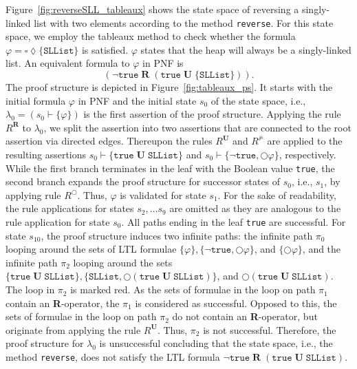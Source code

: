 \documentclass[a4paper, 12pt, twoside]{report}
\begin{document}
	Figure~\ref{fig:reverseSLL_tableaux} shows the state space of reversing a singly-linked list with two elements according to the method \texttt{reverse}. For this state space, we employ the tableaux method to check whether the formula $\varphi=\square \lozenge \{\texttt{SLList}\}$ is satisfied. $\varphi$ states that the heap will always be a singly-linked list. An equivalent formula to $\varphi$ in PNF is \[(\neg \texttt{true}\;\textbf{R}\;(\texttt{true}\;\textbf{U}\;\{\texttt{SLList}\})).\] The proof structure is depicted in Figure~\ref{fig:tableaux_ps}. It starts with the initial formula $\varphi$ in PNF and the initial state $s_0$ of the state space, i.e., $\lambda_0 = (s_0 \vdash \{\varphi\})$ is the first assertion of the proof structure. Applying the rule $R^{\textbf{R}}$ to $\lambda_0$, we split the assertion into two assertions that are connected to the root assertion via directed edges. Thereupon the rules $R^{\textbf{U}}$ and $R^{\nvDash}$ are applied to the resulting assertions $s_0 \vdash \{\texttt{true}\;\textbf{U}\;\texttt{SLList}\}$ and  $s_0 \vdash \{\neg\texttt{true}, \bigcirc\varphi\}$, respectively. While the first branch terminates in the leaf with the Boolean value \texttt{true}, the second branch expands the proof structure for successor states of $s_0$, i.e., $s_1$, by applying rule $R^{\bigcirc}$. Thus, $\varphi$ is validated for state $s_1$. For the sake of readability, the rule applications for states $s_2, \dots s_9$ are omitted as they are analogous to the rule application for state $s_0$. All paths ending in the leaf \texttt{true} are successful. For state $s_{10}$, the proof structure induces two infinite paths: the infinite path $\pi_0$ looping around the sets of LTL formulae $\{\varphi\}, \{\neg\texttt{true},\bigcirc\varphi\}$, and $\{\bigcirc\varphi\}$, and the infinite path $\pi_2$ looping around the sets $\{\texttt{true}\;\textbf{U}\;\texttt{SLList}\},\{\texttt{SLList}, \bigcirc(\texttt{true}\;\textbf{U}\;\texttt{SLList})\}$, and $\bigcirc(\texttt{true}\;\textbf{U}\;\texttt{SLList})$. The loop in $\pi_2$ is marked red. As the sets of formulae in the loop on path $\pi_1$ contain an \textbf{R}-operator, the $\pi_1$ is considered as successful. Opposed to this, the sets of formulae in the loop on path $\pi_2$ do not contain an \textbf{R}-operator, but originate from applying the rule $R^{\textbf{U}}$. Thus, $\pi_2$ is not successful. Therefore, the proof structure for $\lambda_0$ is unsuccessful concluding that the state space, i.e., the method \texttt{reverse}, does not satisfy the LTL formula $\neg\texttt{true}\;\textbf{R}\;(\texttt{true}\;\textbf{U}\;\texttt{SLList})$.\\
	
\end{document}
